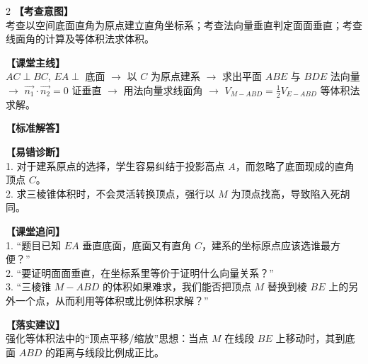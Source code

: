 \documentclass[11pt,a4paper]{ctexart}
\begin{document}
\newpage


\begin{minipage}[t]{0.65\textwidth}
  \vspace{0pt}
  {\small \qTJWZeroSixSixteenStem}
\end{minipage}
\begin{minipage}[t]{0.32\textwidth}
  \vspace{0pt}
  \hfill
  \qTJWZeroSixSixteenFigure[1.1]
\end{minipage}

\vspace{0.8em}

\begin{paracol}{2}
  \textbf{【考查意图】}\\
  考查以空间底面直角为原点建立直角坐标系；考查法向量垂直判定面面垂直；考查线面角的计算及等体积法求体积。
  
  \textbf{【课堂主线】}\\
  $AC \perp BC$, $EA \perp$ 底面 $\to$ 以 $C$ 为原点建系 $\to$ 求出平面 $ABE$ 与 $BDE$ 法向量 $\to$ $\vec{n_1}\cdot\vec{n_2}=0$ 证垂直 $\to$ 用法向量求线面角 $\to$ $V_{M-ABD} = \frac{1}{2}V_{E-ABD}$ 等体积法求解。
  
  \textbf{【标准解答】}\\
  {\small \qTJWZeroSixSixteenSolution}

  \switchcolumn
  \textbf{【易错诊断】}\\
  1. 对于建系原点的选择，学生容易纠结于投影高点 $A$，而忽略了底面现成的直角顶点 $C$。\\
  2. 求三棱锥体积时，不会灵活转换顶点，强行以 $M$ 为顶点找高，导致陷入死胡同。
  
  \textbf{【课堂追问】}\\
  1. “题目已知 $EA$ 垂直底面，底面又有直角 $C$，建系的坐标原点应该选谁最方便？”\\
  2. “要证明面面垂直，在坐标系里等价于证明什么向量关系？”\\
  3. “三棱锥 $M-ABD$ 的体积如果难求，我们能否把顶点 $M$ 替换到棱 $BE$ 上的另外一个点，从而利用等体积或比例体积求解？”
  
  \textbf{【落实建议】}\\
  强化等体积法中的“顶点平移/缩放”思想：当点 $M$ 在线段 $BE$ 上移动时，其到底面 $ABD$ 的距离与线段比例成正比。
\end{paracol}
\end{document}
